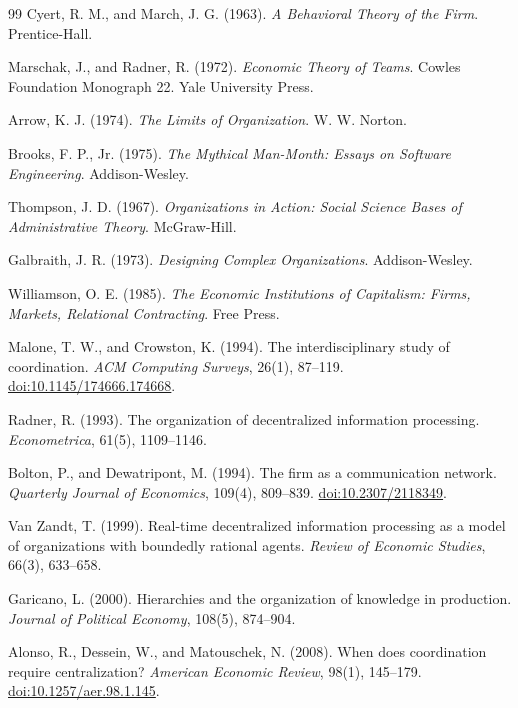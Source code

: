 \documentclass[11pt]{article}
\begin{document}
\begin{thebibliography}{99}
Cyert, R. M., and March, J. G. (1963).
\newblock \emph{A Behavioral Theory of the Firm}.
\newblock Prentice-Hall.

Marschak, J., and Radner, R. (1972).
\newblock \emph{Economic Theory of Teams}.
\newblock Cowles Foundation Monograph 22. Yale University Press.

Arrow, K. J. (1974).
\newblock \emph{The Limits of Organization}.
\newblock W. W. Norton.

Brooks, F. P., Jr. (1975).
\newblock \emph{The Mythical Man-Month: Essays on Software Engineering}.
\newblock Addison-Wesley.

Thompson, J. D. (1967).
\newblock \emph{Organizations in Action: Social Science Bases of Administrative
Theory}.
\newblock McGraw-Hill.

Galbraith, J. R. (1973).
\newblock \emph{Designing Complex Organizations}.
\newblock Addison-Wesley.

Williamson, O. E. (1985).
\newblock \emph{The Economic Institutions of Capitalism: Firms, Markets,
Relational Contracting}.
\newblock Free Press.

Malone, T. W., and Crowston, K. (1994).
\newblock The interdisciplinary study of coordination.
\newblock \emph{ACM Computing Surveys}, 26(1), 87--119.
\newblock \href{https://doi.org/10.1145/174666.174668}{doi:10.1145/174666.174668}.

Radner, R. (1993).
\newblock The organization of decentralized information processing.
\newblock \emph{Econometrica}, 61(5), 1109--1146.

Bolton, P., and Dewatripont, M. (1994).
\newblock The firm as a communication network.
\newblock \emph{Quarterly Journal of Economics}, 109(4), 809--839.
\newblock \href{https://doi.org/10.2307/2118349}{doi:10.2307/2118349}.

Van Zandt, T. (1999).
\newblock Real-time decentralized information processing as a model of
organizations with boundedly rational agents.
\newblock \emph{Review of Economic Studies}, 66(3), 633--658.

Garicano, L. (2000).
\newblock Hierarchies and the organization of knowledge in production.
\newblock \emph{Journal of Political Economy}, 108(5), 874--904.

Alonso, R., Dessein, W., and Matouschek, N. (2008).
\newblock When does coordination require centralization?
\newblock \emph{American Economic Review}, 98(1), 145--179.
\newblock \href{https://doi.org/10.1257/aer.98.1.145}{doi:10.1257/aer.98.1.145}.


\end{thebibliography}
\end{document}

